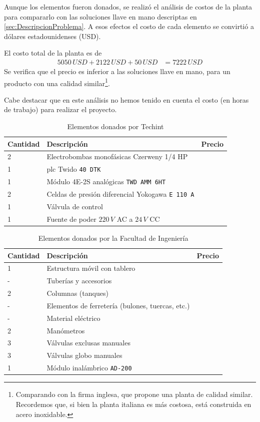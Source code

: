 Aunque los elementos fueron donados, se realizó el análisis de costos de la
planta para compararlo con las soluciones llave en mano descriptas en
\ref{sec:DescripcionProblema}.
A esos efectos el costo de cada elemento se convirtió a dólares
estadounidenses (USD).

El costo total de la planta es de
\begin{align}
5050\,USD + 2122\,USD + 50\,USD &= 7222\,USD
\end{align}
Se verifica que el precio es inferior a las soluciones llave en mano, para un
producto con una calidad similar\footnote{Comparando con la firma inglesa,
que propone una planta de calidad similar. Recordemos que, si bien la planta
italiana es más costosa, está construida en acero inoxidable.}.

Cabe destacar que en este análisis no hemos tenido en cuenta el costo (en
horas de trabajo) para realizar el proyecto.
\begin{table}[!t]
\renewcommand{\arraystretch}{1.4}
\centering
\begin{tabularx}{\textwidth}{l||X||l}
\hline
\bfseries Cantidad & \bfseries Descripción &\bfseries Precio\\
\hline \hline
2& Electrobombas monofásicas Czerweny 1/4 HP &
 {\multirow{6}{*}{5050 USD}}\\
1& \gls{plc} Twido \texttt{40 DTK} &  \\
1& Módulo 4E-2S analógicas \texttt{TWD AMM 6HT}& \\
2& Celdas de presión diferencial Yokogawa \texttt{E 110 A}& \\
1& Válvula de control & \\
1& Fuente de poder $220\,V$ AC a $24\,V$ CC& \\
\hline
\end{tabularx}
\caption{Elementos donados por Techint}
\label{tab:donacionTechint}
\end{table}

\begin{table}[!t]
\renewcommand{\arraystretch}{1.4}
\centering
\begin{tabularx}{\textwidth}{l||X||l}
\hline
\bfseries Cantidad & \bfseries Descripción & \bfseries Precio\\
\hline \hline
1& Estructura móvil con tablero&
 {\multirow{9}{*}{2122 USD}}\\
-& Tuberías y accesorios &  \\
2& Columnas (tanques) &  \\
-& Elementos de ferretería (bulones, tuercas, etc.)& \\
-& Material eléctrico &\\
2& Manómetros& \\
3& Válvulas exclusas manuales& \\
3& Válvulas globo manuales& \\
1& Módulo inalámbrico \texttt{AD-200}&\\
\hline
\end{tabularx}
\caption{Elementos donados por la Facultad de Ingeniería}
\label{tab:donacionFing}
\end{table}

